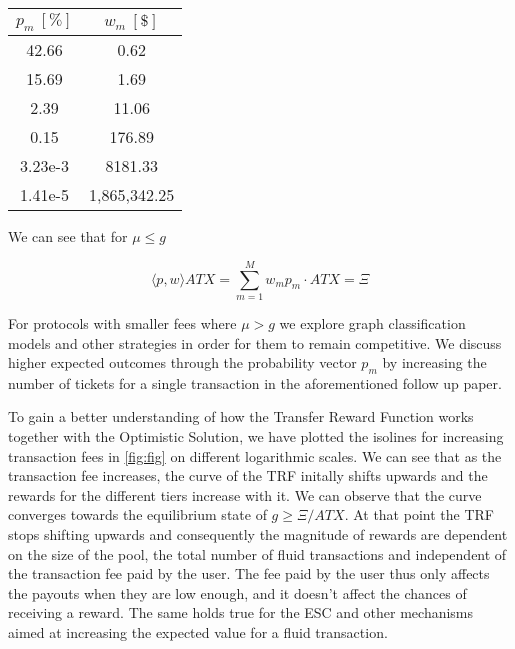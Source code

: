\vspace{1em}
\begingroup
            \centering
            \begin{tabular}{||c | c ||}
            \hline
            $p_m \: [\%]$ & $w_m \: [\$]$ \\[0.5ex]
            \hline
            42.66 & 0.62  \\
            15.69 & 1.69 \\
            2.39 & 11.06 \\
            0.15 & 176.89 \\
            3.23e-3 & 8181.33 \\
            
            1.41e-5 & 1,865,342.25 \\
            \hline
            \end{tabular}
            \par
\endgroup
\vspace{1em}
            

We can see that for $\mu \leq g$

\begin{equation}
    \langle p,w\rangle ATX = \sum_{m=1}^M w_m p_m\cdot ATX = \Xi
\end{equation}

For protocols with smaller fees where $\mu>g$ we explore graph classification models and other strategies in order for them to remain competitive.
We discuss higher expected outcomes through the probability vector $p_m$ by increasing the number of tickets for a single transaction in the aforementioned follow up paper.

\clearpage

To gain a better understanding of how the Transfer Reward Function works together with the Optimistic Solution, we have plotted the isolines for increasing transaction fees in \autoref{fig:fig} on different logarithmic scales. We can see that as the transaction fee increases, the curve of the TRF initally shifts upwards and the rewards for the different tiers increase with it. We can observe that the curve converges towards the equilibrium state of $g \geq \Xi/ATX$. At that point the TRF stops shifting upwards and consequently the magnitude of rewards are dependent on the size of the pool, the total number of fluid transactions and independent of the transaction fee paid by the user. The fee paid by the user thus only affects the payouts when they are low enough, and it doesn't affect the chances of receiving a reward. The same holds true for the ESC and other mechanisms aimed at increasing the expected value for a fluid transaction.


